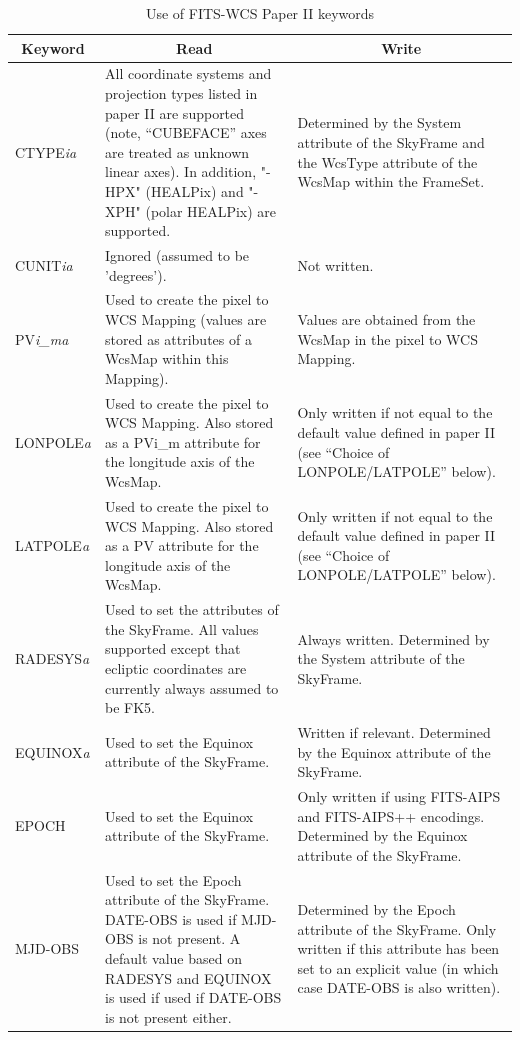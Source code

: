 \documentclass[twoside,11pt]{starlink}
\providecommand{\fitskey}[3]{{#1}&{#2}&{#3}\\}
\begin{document}
\begin{table}[htbp]
\begin{tabular}{|l|p{2.5in}|p{2.5in}|}
\hline
\multicolumn{1}{|c|}{\textbf{Keyword}} & \multicolumn{1}{c|}{\textbf{Read}}
& \multicolumn{1}{c|}{\textbf{Write}} \\ \hline

\fitskey{CTYPE\emph{ia}}{All coordinate systems and projection types
listed in paper II are supported (note, ``CUBEFACE'' axes are treated as
unknown linear axes). In addition, "-HPX" (HEALPix) and "-XPH" (polar
HEALPix) are supported.}{Determined by the System attribute
of the SkyFrame and the WcsType attribute of the
WcsMap within the FrameSet.}

\fitskey{CUNIT\emph{ia}}{Ignored (assumed to be 'degrees').}{Not written.}

\fitskey{PV\emph{i\_ma}}{Used to create the pixel to WCS Mapping (values
are stored as attributes of a WcsMap within this Mapping).}{Values are
obtained from the WcsMap in the pixel to WCS Mapping.}

\fitskey{LONPOLE\emph{a}}{Used to create the pixel to WCS Mapping. Also
stored as a PVi\_m attribute for the longitude axis of the WcsMap.}{Only
written if not equal to the default value defined in paper II (see
``Choice of LONPOLE/LATPOLE'' below).}

\fitskey{LATPOLE\emph{a}}{Used to create the pixel to WCS Mapping. Also
stored as a PV attribute for the longitude axis of the WcsMap.}{Only
written if not equal to the default value defined in paper II (see
``Choice of LONPOLE/LATPOLE'' below).}

\fitskey{RADESYS\emph{a}}{Used to set the attributes of the SkyFrame. All
values supported except that ecliptic coordinates are currently always
assumed to be FK5.}{Always written. Determined by the System attribute of
the SkyFrame.}

\fitskey{EQUINOX\emph{a}}{Used to set the Equinox attribute
of the SkyFrame.}{Written if relevant. Determined by the Equinox attribute of
the SkyFrame.}

\fitskey{EPOCH}{Used to set the Equinox attribute of the SkyFrame.}{Only
written if using FITS-AIPS and FITS-AIPS++ encodings. Determined by the Equinox attribute
of the SkyFrame.}

\fitskey{MJD-OBS}{Used to set the Epoch attribute of the
SkyFrame. DATE-OBS is used if MJD-OBS is not present. A default value based on
RADESYS and EQUINOX is used if used if DATE-OBS is not present
either.}{Determined by the Epoch attribute of the SkyFrame. Only written
if this attribute has been set to an explicit value (in which case
DATE-OBS is also written).}

\hline
\end{tabular}
\vspace{3.mm}
\caption{Use of FITS-WCS Paper II keywords}
\label{tab:fitspaper2}
\end{table}
\end{document}
